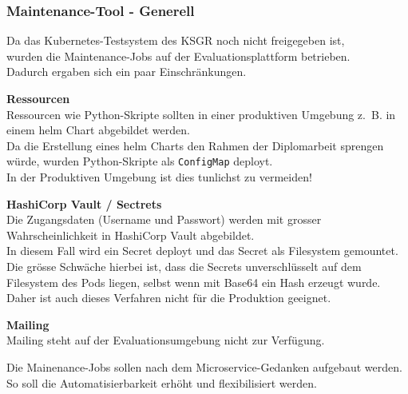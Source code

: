 
\begin{flushleft}
    \subsubsection{Maintenance-Tool - Generell}
    Da das \Gls{Kubernetes}-Testsystem des KSGR noch nicht freigegeben ist,\\
    wurden die Maintenance-Jobs auf der Evaluationsplattform betrieben.\\
    Dadurch ergaben sich ein paar Einschränkungen.
    \begin{description}
        \item \textbf{Ressourcen}\hfill \\Ressourcen wie Python-Skripte sollten in einer produktiven Umgebung z. B. in einem \Gls{helm} Chart abgebildet werden.\\Da die Erstellung eines \gls{helm} Charts den Rahmen der Diplomarbeit sprengen würde, wurden Python-Skripte als \texttt{ConfigMap} deployt.\\In der Produktiven Umgebung ist dies tunlichst zu vermeiden!
        \item \textbf{HashiCorp Vault / Sectrets}\hfill \\Die Zugangsdaten (Username und Passwort) werden mit grosser Wahrscheinlichkeit in HashiCorp Vault\cite{ANQ2ENVU} abgebildet.\\In diesem Fall wird ein Secret deployt und das Secret als Filesystem gemountet.\\Die grösse Schwäche hierbei ist, dass die Secrets unverschlüsselt auf dem Filesystem des Pods liegen, selbst wenn mit Base64 ein Hash erzeugt wurde.\\Daher ist auch dieses Verfahren nicht für die Produktion geeignet.
        \item \textbf{Mailing}\hfill \\Mailing steht auf der Evaluationsumgebung nicht zur Verfügung.
    \end{description}
\end{flushleft}
\begin{flushleft}
    Die Mainenance-Jobs sollen nach dem Microservice-Gedanken aufgebaut werden.\\
    So soll die Automatisierbarkeit erhöht und flexibilisiert werden.
\end{flushleft}